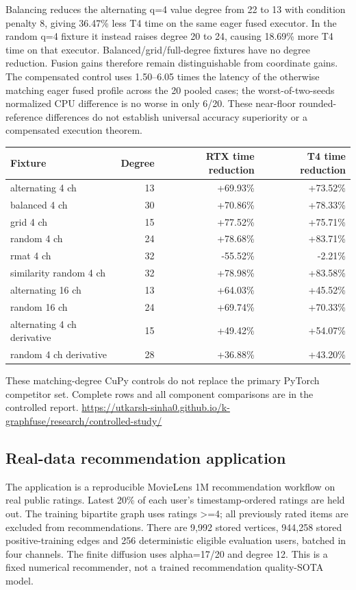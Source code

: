 \documentclass[10pt]{article}
\begin{document}
Balancing reduces the alternating q=4 value degree from 22 to 13 with condition penalty 8, giving 36.47\% less T4 time on the same eager fused executor. In the random q=4 fixture it instead raises degree 20 to 24, causing 18.69\% more T4 time on that executor. Balanced/grid/full-degree fixtures have no degree reduction. Fusion gains therefore remain distinguishable from coordinate gains. The compensated control uses 1.50--6.05 times the latency of the otherwise matching eager fused profile across the 20 pooled cases; the worst-of-two-seeds normalized CPU difference is no worse in only 6/20. These near-floor rounded-reference differences do not establish universal accuracy superiority or a compensated execution theorem.

\begin{center}\small\begin{tabular}{lrrr}\toprule
Fixture & Degree & RTX time reduction & T4 time reduction \\
\midrule
alternating 4 ch & 13 & +69.93\% & +73.52\% \\
balanced 4 ch & 30 & +70.86\% & +78.33\% \\
grid 4 ch & 15 & +77.52\% & +75.71\% \\
random 4 ch & 24 & +78.68\% & +83.71\% \\
rmat 4 ch & 32 & -55.52\% & -2.21\% \\
similarity random 4 ch & 32 & +78.98\% & +83.58\% \\
alternating 16 ch & 13 & +64.03\% & +45.52\% \\
random 16 ch & 24 & +69.74\% & +70.33\% \\
alternating 4 ch derivative & 15 & +49.42\% & +54.07\% \\
random 4 ch derivative & 28 & +36.88\% & +43.20\% \\
\bottomrule\end{tabular}\end{center}
These matching-degree CuPy controls do not replace the primary PyTorch competitor set. Complete rows and all component comparisons are in the controlled report.
\url{https://utkarsh-sinha0.github.io/k-graphfuse/research/controlled-study/}

\subsection{Real-data recommendation application}

The application is a reproducible MovieLens 1M recommendation workflow on real public ratings. Latest 20\% of each user's timestamp-ordered ratings are held out. The training bipartite graph uses ratings >=4; all previously rated items are excluded from recommendations. There are 9,992 stored vertices, 944,258 stored positive-training edges and 256 deterministic eligible evaluation users, batched in four channels. The finite diffusion uses alpha=17/20 and degree 12. This is a fixed numerical recommender, not a trained recommendation quality-SOTA model.
\end{document}
